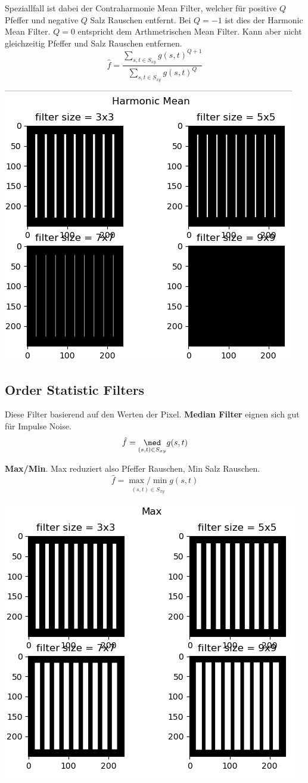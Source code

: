Speziallfall ist dabei der Contraharmonie Mean Filter, welcher für positive $Q$ Pfeffer und negative $Q$ Salz Rauschen entfernt. Bei $Q=-1$ ist dies der Harmonic Mean Filter. $Q=0$ entspricht dem Arthmetrischen Mean Filter. Kann aber nicht gleichzeitig Pfeffer und Salz Rauschen entfernen.
\[
\hat{f} = \frac{\sum_{s,t\in S_{xy}}g(s,t)^{Q+1}}{\sum_{s,t\in S_{xy}}g(s,t)^Q}
\]
\begin{center}
	\includegraphics[width=0.8\columnwidth]{Images/harmonic}
\end{center}


\subsection{Order Statistic Filters}
Diese Filter basierend auf den Werten der Pixel.
\textbf{Median Filter} eignen sich gut für Impulse Noise.
\[
\hat{f} = \underset{(s,t)\in S_{xy}}\med g(s,t)
\]

\textbf{Max/Min}. Max reduziert also Pfeffer Rauschen, Min Salz Rauschen.
\[
\hat{f} = \underset{(s,t)\in S_{xy}}{\max/\min} g(s,t)
\]
\begin{center}
	\includegraphics[width=0.8\columnwidth]{Images/max}
\end{center}


